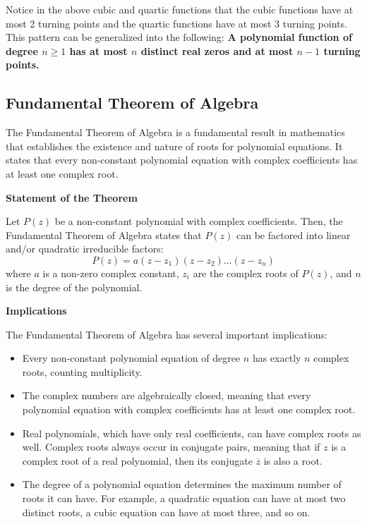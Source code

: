 \documentclass[11pt]{article}
\begin{document}
Notice in the above cubic and quartic functions that the cubic functions have at most 2 turning points and the quartic functions have at most 3 turning points. This pattern can be generalized into the following: \textbf{A polynomial function of degree $n \geq 1$ has at most $n$ distinct real zeros and at most $n - 1$ turning points.}

\subsection{Fundamental Theorem of Algebra}
The Fundamental Theorem of Algebra is a fundamental result in mathematics that establishes the existence and nature of roots for polynomial equations. It states that every non-constant polynomial equation with complex coefficients has at least one complex root.

\textbf{Statement of the Theorem}

Let $P(z)$ be a non-constant polynomial with complex coefficients. Then, the Fundamental Theorem of Algebra states that $P(z)$ can be factored into linear and/or quadratic irreducible factors:
\[ P(z) = a(z - z_1)(z - z_2)\ldots(z - z_n) \]
where $a$ is a non-zero complex constant, $z_i$ are the complex roots of $P(z)$, and $n$ is the degree of the polynomial.

\textbf{Implications}

The Fundamental Theorem of Algebra has several important implications:
\begin{itemize}
  \item Every non-constant polynomial equation of degree $n$ has exactly $n$ complex roots, counting multiplicity.
  
  \item The complex numbers are algebraically closed, meaning that every polynomial equation with complex coefficients has at least one complex root.
  
  \item Real polynomials, which have only real coefficients, can have complex roots as well. Complex roots always occur in conjugate pairs, meaning that if $z$ is a complex root of a real polynomial, then its conjugate $\overline{z}$ is also a root.
  
  \item The degree of a polynomial equation determines the maximum number of roots it can have. For example, a quadratic equation can have at most two distinct roots, a cubic equation can have at most three, and so on.
\end{itemize}
\end{document}
